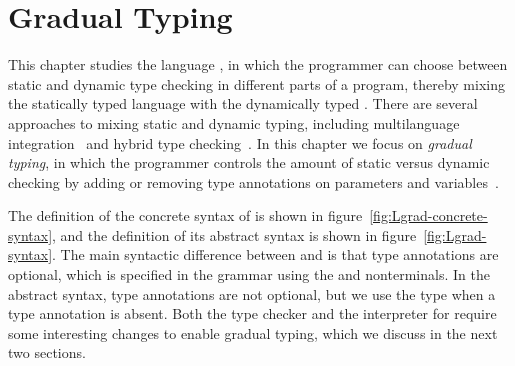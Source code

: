 \documentclass[7x10]{TimesAPriori_MIT}%
\numberwithin{theorem}{chapter}
\numberwithin{definition}{chapter}
\numberwithin{equation}{chapter}
\begin{document}
\chapter{Gradual Typing}
\label{ch:Lgrad}
\setcounter{footnote}{0}

This chapter studies the language \LangGrad{}, in which the programmer
can choose between static and dynamic type checking in different parts
of a program, thereby mixing the statically typed \LangLam{} language
with the dynamically typed \LangDyn{}. There are several approaches to
mixing static and dynamic typing, including multilanguage
integration~\citep{Tobin-Hochstadt:2006fk,Matthews:2007zr} and hybrid
type checking~\citep{Flanagan:2006mn,Gronski:2006uq}. In this chapter
we focus on \emph{gradual typing}, in which the
programmer controls the amount of static versus dynamic checking by
adding or removing type annotations on parameters and
variables~\citep{Anderson:2002kd,Siek:2006bh}.

The definition of the concrete syntax of \LangGrad{} is shown in
figure~\ref{fig:Lgrad-concrete-syntax}, and the definition of its
abstract syntax is shown in figure~\ref{fig:Lgrad-syntax}. The main
syntactic difference between \LangLam{} and \LangGrad{} is that type
annotations are optional, which is specified in the grammar using the
\Param{} and  nonterminals. In the abstract syntax, type
annotations are not optional, but we use the \CANYTY{} type when a type
annotation is absent.
%
Both the type checker and the interpreter for \LangGrad{} require some
interesting changes to enable gradual typing, which we discuss in the
next two sections.

\newcommand{\LgradGrammarRacket}{
\begin{array}{lcl}
  \Type &::=& \LP\Type \ldots \; \key{->}\; \Type\RP \\
  \Param &::=& \Var \MID \LS\Var \key{:} \Type\RS \\
  \itm{ret} &::=& \epsilon \MID \key{:} \Type \\
  \Exp &::=& \LP\Exp \; \Exp \ldots\RP 
      \MID \CGLAMBDA{\LP\Param\ldots\RP}{\itm{ret}}{\Exp} \\
    &\MID& \LP \key{procedure-arity}~\Exp\RP \\
  \Def &::=& \CGDEF{\Var}{\Param\ldots}{\itm{ret}}{\Exp} 
\end{array}
}

\newcommand{\LgradASTRacket}{
\begin{array}{lcl}
  \Type &::=& \LP\Type \ldots \; \key{->}\; \Type\RP \\
  \Param &::=& \Var \MID \LS\Var \key{:} \Type\RS \\
  \Exp &::=& \APPLY{\Exp}{\Exp\ldots}
  \MID \LAMBDA{\LP\Param\ldots\RP}{\Type}{\Exp} \\
  \itm{op} &::=& \code{procedure-arity} \\
 \Def &::=& \FUNDEF{\Var}{\LP\Param\ldots\RP}{\Type}{\code{'()}}{\Exp} 
\end{array}
}
\end{document}
